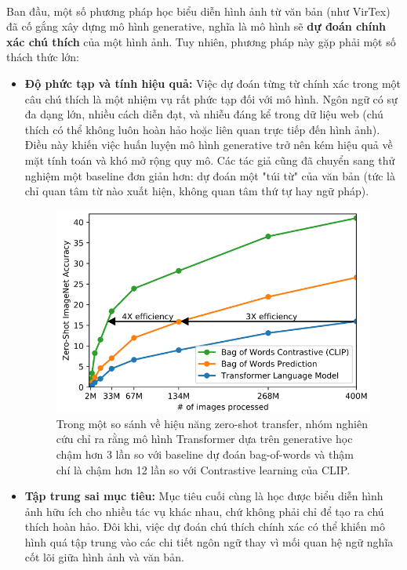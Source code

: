 \paragraph{}{Ban đầu, một số phương pháp học biểu diễn hình ảnh từ văn bản (như VirTex) đã cố gắng xây dựng mô hình generative, nghĩa là mô hình sẽ \textbf{dự đoán chính xác chú thích} của một hình ảnh. Tuy nhiên, phương pháp này gặp phải một số thách thức lớn:}
\begin{itemize}
    \item \textbf{Độ phức tạp và tính hiệu quả:} Việc dự đoán từng từ chính xác trong một câu chú thích là một nhiệm vụ rất phức tạp đối với mô hình. Ngôn ngữ có sự đa dạng lớn, nhiều cách diễn đạt, và nhiễu đáng kể trong dữ liệu web (chú thích có thể không luôn hoàn hảo hoặc liên quan trực tiếp đến hình ảnh). Điều này khiến việc huấn luyện mô hình generative trở nên kém hiệu quả về mặt tính toán và khó mở rộng quy mô. Các tác giả cũng đã chuyển sang thử nghiệm một baseline đơn giản hơn: dự đoán một "túi từ" của văn bản (tức là chỉ quan tâm từ nào xuất hiện, không quan tâm thứ tự hay ngữ pháp).
    \begin{figure}[H]
    \centering
        \includegraphics[width=\textwidth]{img/03-zero_shot_comparison.png}
        \captionsetup{width=0.9\textwidth}
        \caption{Trong một so sánh về hiệu năng zero-shot transfer, nhóm nghiên cứu chỉ ra rằng mô hình Transformer dựa trên generative học chậm hơn 3 lần so với baseline dự đoán bag-of-words và thậm chí là chậm hơn 12 lần so với Contrastive learning của CLIP.}
        \label{fig:zero_shot_comparison}
    \end{figure}
    \item \textbf{Tập trung sai mục tiêu:} Mục tiêu cuối cùng là học được biểu diễn hình ảnh hữu ích cho nhiều tác vụ khác nhau, chứ không phải chỉ để tạo ra chú thích hoàn hảo. Đôi khi, việc dự đoán chú thích chính xác có thể khiến mô hình quá tập trung vào các chi tiết ngôn ngữ thay vì mối quan hệ ngữ nghĩa cốt lõi giữa hình ảnh và văn bản.
\end{itemize}
